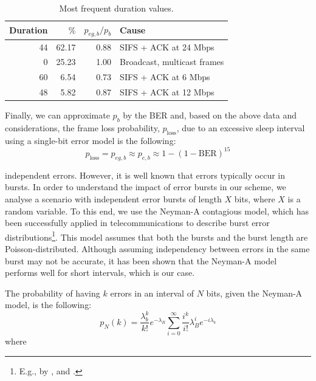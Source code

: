 \documentclass[twoside,nohyper]{tufte-book}
\begin{document}
\begin{table}

\begin{center}
\begin{tabular}{rrrl}
\toprule
Duration & $\%$ & $p_{eg,b}/p_b$ & Cause\\
\midrule
44 & 62.17 & 0.88 & SIFS + ACK at 24 Mbps\\
0 & 25.23 & 1.00 & Broadcast, multicast frames\\
60 & 6.54 & 0.73 & SIFS + ACK at 6 Mbps\\
48 & 5.82 & 0.87 & SIFS + ACK at 12 Mbps\\
\bottomrule
\end{tabular}
\end{center}
\caption{\label{tab:duration}Most frequent duration values.}
\end{table}

Finally, we can approximate \(p_b\) by the BER and, based on the above data and considerations, the frame loss probability, \(p_{\mathrm{loss}}\), due to an excessive sleep interval using a single-bit error model is the following:
%
\begin{equation}
 p_{\mathrm{loss}} = p_{eg,b} \approx p_{e,b} \approx 1 - (1 - \mathrm{BER})^{15}
 \label{eq:plossbit}
\end{equation}
%


 independent errors. However, it is well known that errors typically occur in bursts. In order to understand the impact of error bursts in our scheme, we analyse a scenario with independent error bursts of length \(X\) bits, where \(X\) is a random variable. To this end, we use the Neyman-A contagious model\cite[-10mm]{neyman1939new}, which has been successfully applied in telecommunications to describe burst error distributions\footnote{E.g., by \citet{s614}, \citet{becam1985validite} and \citet{irvin1991monitoring}.}. This model assumes that both the bursts and the burst length are Poisson-distributed. Although assuming independency between errors in the same burst may not be accurate, it has been shown that the Neyman-A model performs well for short intervals\cite[0pt]{cornaglia1996letter}, which is our case.

The probability of having \(k\) errors in an interval of \(N\) bits, given the Neyman-A model, is the following:
%
\begin{equation}
 p_N(k) = \frac{\lambda_b^k}{k!}e^{-\lambda_B}\sum_{i=0}^\infty\frac{i^k}{i!}\lambda_B^i e^{-i\lambda_b}
 \label{eq:pNk}
\end{equation}
%
where
\end{document}
